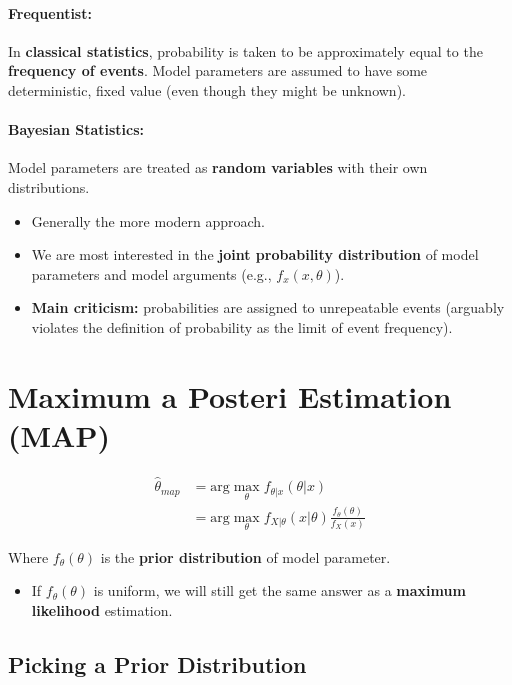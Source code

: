 \documentclass[a4paper,12pt]{report}
\begin{document}
\paragraph{Frequentist: } In \textbf{classical statistics}, probability is taken to be approximately equal to the \textbf{frequency of events}. Model parameters are assumed to have some deterministic, fixed value (even though they might be unknown).

\paragraph{Bayesian Statistics: } Model parameters are treated as \textbf{random variables} with their own distributions.
\begin{itemize}
\item Generally the more modern approach.
\item We are most interested in the \textbf{joint probability distribution} of model parameters and model arguments (e.g., $f_x(x, \theta)$).
\item \textbf{Main criticism:} probabilities are assigned to unrepeatable events (arguably violates the definition of probability as the limit of event frequency).
\end{itemize}


\section{Maximum a Posteri Estimation (MAP)}

\begin{equation}
\begin{split}
\hat\theta_{map} &= \text{arg}\max_{\theta} f_{\theta | x} (\theta | x)\\
&= \text{arg}\max_\theta f_{X|\theta} (x | \theta) \frac{f_\theta(\theta)}{f_X(x)} 
\end{split}
\end{equation} 


Where $f_\theta(\theta)$ is the \textbf{prior distribution} of model parameter. 
\begin{itemize}
\item If $f_\theta(\theta)$ is uniform, we will still get the same answer as a \textbf{maximum likelihood} estimation.
\end{itemize}


\subsection{Picking a Prior Distribution}
\end{document}
